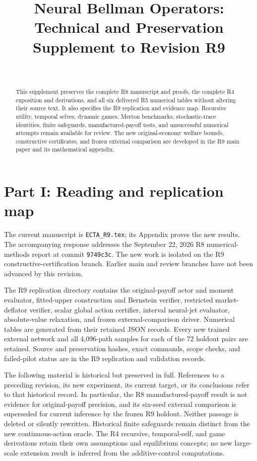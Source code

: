 \documentclass[ecta]{econsocart}
\renewcommand{\[}{\begingroup\small\ROpenDisplay}
\renewcommand{\]}{\RCloseDisplay\endgroup}
\theoremstyle{remark}
\begin{document}
\begin{frontmatter}
\title{Neural Bellman Operators: Technical and Preservation Supplement to Revision R9}
\begin{aug}
\author[id=au1,addressref={add1}]{~}
\address[id=add1]{}
\end{aug}
\begin{abstract}
This supplement preserves the complete R8 manuscript and proofs, the complete R4 exposition and derivations, and all six delivered R5 numerical tables without altering their source text. It also specifies the R9 replication and evidence map. Recursive utility, temporal selves, dynamic games, Merton benchmarks, stochastic-trace identities, finite safeguards, manufactured-payoff tests, and unsuccessful numerical attempts remain available for review. The new original-economy welfare bounds, constructive certificates, and frozen external comparison are developed in the R9 main paper and its mathematical appendix.
\end{abstract}
\end{frontmatter}
\section*{Part I: Reading and replication map}
The current manuscript is \texttt{ECTA\_R9.tex}; its Appendix proves the new results. The accompanying response addresses the September 22, 2026 R8 numerical-methods report at commit \texttt{9749c3c}. The new work is isolated on the R9 constructive-certification branch. Earlier main and review branches have not been advanced by this revision.

The R9 replication directory contains the original-payoff actor and moment evaluator, fitted-upper construction and Bernstein verifier, restricted market-deflator verifier, scalar global action certifier, interval neural-jet evaluator, absolute-value relaxation, and frozen external-comparison driver. Numerical tables are generated from their retained JSON records. Every new trained external network and all 4,096-path samples for each of the 72 holdout pairs are retained. Source and preservation hashes, exact commands, scope checks, and failed-pilot status are in the R9 replication and validation records.

The following material is historical but preserved in full. References to a preceding revision, its new experiment, its current target, or its conclusions refer to that historical record. In particular, the R8 manufactured-payoff result is not evidence for original-payoff precision, and its six-seed external comparison is superseded for current inference by the frozen R9 holdout. Neither passage is deleted or silently rewritten. Historical finite safeguards remain distinct from the new continuous-action oracle. The R4 recursive, temporal-self, and game derivations retain their own assumptions and equilibrium concepts; no new large-scale extension result is inferred from the additive-control computations.
\end{document}

